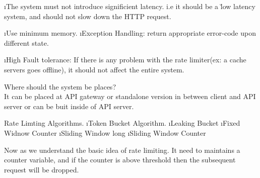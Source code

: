 \lstart
    \i The system must not introduce significient latency. i.e it should be a \u{low latency} system, and should not slow down the HTTP request.
    
    \i Use minimum memory.
    \i  Exception Handling: return appropriate error-code upon different state.

    \i High Fault tolerance: If there is any problem with the rate limiter(ex: a cache servers goes offline), it should not affect the entire system.
\lend


Where should the system be places?\\
It can be placed at API gateway or standalone version in between client and API server or can be buit inside of API server.

Rate Limting Algorithms.
\ls
    \i Token Bucket Algorithm.
    \i Leaking Bucket
    \i Fixed Widnow Counter
    \i Sliding Window long
    \i Sliding Window Counter
\le



Now as we understand the basic idea of rate limiting. It need to maintains a counter variable, and if the counter is above threshold then the subsequent request will be dropped.





